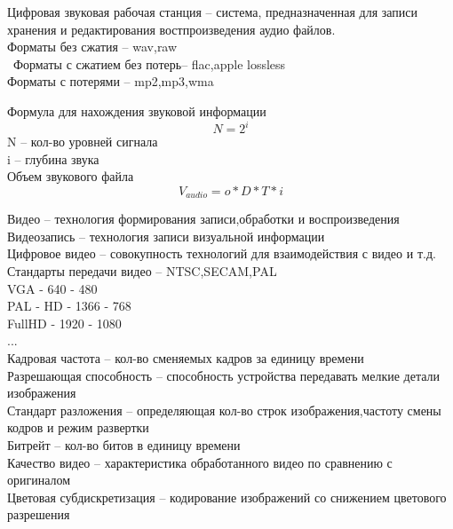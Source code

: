 \documentclass[a4paper, 12pt]{article}
\begin{document}
Цифровая звуковая рабочая станция -- система, предназначенная для записи хранения и редактирования востпроизведения аудио файлов.\\

Форматы без сжатия -- wav,raw\\\
Форматы с сжатием без потерь-- flac,apple lossless\\
Форматы с потерями -- mp2,mp3,wma\\

\begin{mdframed}[backgroundcolor=blue!20] 
       Формула для нахождения звуковой информации
       \[
         N = 2^i
       \]
       N -- кол-во уровней сигнала\\
       i -- глубина звука\\

       Объем звукового файла
       \[
         V_{audio} = o*D*T*i
       \]

    \end{mdframed}
    
Видео -- технология формирования записи,обработки и воспроизведения\\

Видеозапись -- технология записи визуальной информации\\

Цифровое видео -- совокупность технологий для взаимодействия с видео и т.д.\\

Стандарты передачи видео -- NTSC,SECAM,PAL\\

VGA - 640 - 480\\
PAL - 
HD - 1366 - 768\\
FullHD - 1920 - 1080\\
...\\

Кадровая частота -- кол-во сменяемых кадров за единицу времени\\

Разрешающая способность -- способность устройства передавать мелкие детали изображения\\

Стандарт разложения -- определяющая кол-во строк изображения,частоту смены кодров и режим развертки\\

Битрейт -- кол-во битов в единицу времени\\
Качество видео -- характеристика обработанного видео по сравнению с оригиналом\\
Цветовая субдискретизация -- кодирование изображений со снижением цветового разрешения\\
\end{document}

